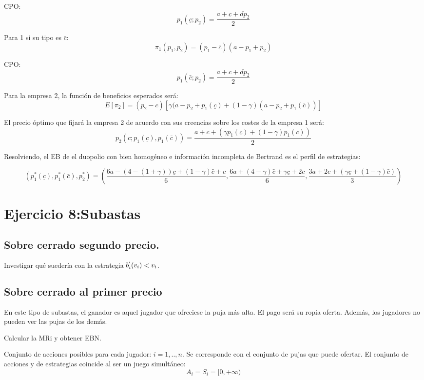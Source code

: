 \documentclass{article}
\theoremstyle{definition}
\theoremstyle{remark}
\begin{document}
CPO:
$$p_1(\underline{c};p_2)=\frac{a+\underline{c}+dp_2}{2}$$

Para 1 si su tipo es $\bar{c}$:
$$\pi_1(p_1,p_2)=(p_1-\bar{c})(a-p_1+p_2)$$

CPO:
$$p_1(\bar{c};p_2)=\frac{a+\bar{c}+dp_2}{2}$$

Para la empresa 2, la funci\'on de beneficios esperados ser\'a:
$$E[\pi_2]=(p_2-c)[\gamma(a-p_2+p_1(\underline{c})+(1-\gamma)(a-p_2+p_1(\bar{c}))]$$

El precio \'optimo que fijar\'a la empresa 2 de acuerdo con sus creencias sobre los costes de la empresa 1 ser\'a:
$$p_2(c;p_1(\underline{c}),p_1(\bar{c}))=\frac{a+c+(\gamma p_1(\underline{c})+(1-\gamma)p_1(\bar{c}))}{2}$$

Resolviendo, el EB de el duopolio con bien homog\'eneo e informaci\'on incompleta de Bertrand es el perfil de estrategias:

$${(p_1^*(\underline{c}),p_1^*(\bar{c}),p_2^*)}={(\frac{6a-(4-(1+\gamma))\underline{c}+(1-\gamma)\bar{c}+c}{6},\frac{6a+(4-\gamma)\bar{c}+\gamma \underline{c}+2c}{6},\frac{3a+2c+(\gamma \underline{c}+(1-\gamma)\bar{c})}{3})}$$









\section{Ejercicio 8:Subastas}
\subsection{Sobre cerrado segundo precio.}
Investigar qu\'e sueder\'ia con la estrategia $b_i^`(v_i)<v_i$.
\subsection{Sobre cerrado al primer precio}

En este tipo de subastas, el ganador es aquel jugador que ofreciese la puja m\'as alta. El pago ser\'a su ropia oferta. Adem\'as, los jugadores no pueden ver las pujas de los dem\'as.

Calcular la MRi y obtener EBN.

Conjunto de acciones posibles para cada jugador: $i=1,..,n$. Se corresponde con el conjunto de pujas que puede ofertar.
El conjunto de acciones y de estrategias coincide al ser un juego simult\'aneo:
$$A_i=S_i=[0,+\infty)$$
\end{document}
